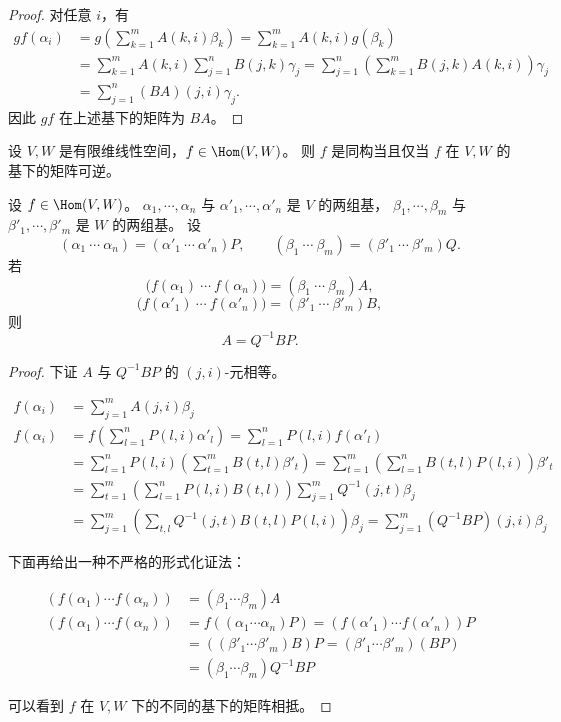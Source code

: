 \begin{proof}
	对任意 $i$，有
	\[
	\begin{aligned}
		gf(\alpha_i)
		&=g\left(\sum_{k=1}^{m}A(k,i)\beta_k\right)=\sum_{k=1}^{m}A(k,i)g(\beta_k)\\
		&=\sum_{k=1}^{m}A(k,i)\sum_{j=1}^{n}B(j,k)\gamma_j=\sum_{j=1}^{n}\left(\sum_{k=1}^{m}B(j,k)A(k,i)\right)\gamma_j\\
		&=\sum_{j=1}^{n}(BA)(j,i)\gamma_j.
	\end{aligned}
	\]
	因此 $gf$ 在上述基下的矩阵为 $BA$。
\end{proof}

\begin{corollary}
	设 $V,W$ 是有限维线性空间，$f\in\Hom(V,W)$。
	则 $f$ 是同构当且仅当 $f$ 在 $V,W$ 的基下的矩阵可逆。
\end{corollary}

\begin{proposition}
	设 $f\in\Hom(V,W)$。
	$\alpha_1,\cdots,\alpha_n$ 与 $\alpha'_1,\cdots,\alpha'_n$ 是 $V$ 的两组基，
	$\beta_1,\cdots,\beta_m$ 与 $\beta'_1,\cdots,\beta'_m$ 是 $W$ 的两组基。
	设
	\[
	(\alpha_1\ \cdots\ \alpha_n)
	=(\alpha'_1\ \cdots\ \alpha'_n)P,
	\qquad
	(\beta_1\ \cdots\ \beta_m)
	=(\beta'_1\ \cdots\ \beta'_m)Q.
	\]
	若
	\[
	\bigl(f(\alpha_1)\ \cdots\ f(\alpha_n)\bigr)
	=(\beta_1\ \cdots\ \beta_m)A,
	\]
	\[
	\bigl(f(\alpha'_1)\ \cdots\ f(\alpha'_n)\bigr)
	=(\beta'_1\ \cdots\ \beta'_m)B,
	\]
	则
	\[
	A=Q^{-1}BP.
	\]
\end{proposition}

\begin{proof}
	下证 $A$ 与 $Q^{-1}BP$ 的 $(j,i)$-元相等。
	
	\[
	\begin{aligned}
		f(\alpha_i) &= \sum_{j=1}^m A(j,i) \beta_j \\
		f(\alpha_i) &= f\left( \sum_{l=1}^n P(l,i) \alpha'_l \right) = \sum_{l=1}^n P(l,i) f(\alpha'_l)\\
			&= \sum_{l=1}^n P(l,i) \left( \sum_{t=1}^m B(t,l) \beta'_t \right) = \sum_{t=1}^m \left( \sum_{l=1}^n B(t,l) P(l,i) \right) \beta'_t \\
		&= \sum_{t=1}^m \left( \sum_{l=1}^n P(l,i) B(t,l) \right) \sum_{j=1}^m Q^{-1}(j,t) \beta_j \\
		&= \sum_{j=1}^m \left( \sum_{t,l} Q^{-1}(j,t) B(t,l) P(l,i) \right) \beta_j = \sum_{j=1}^m (Q^{-1}BP)(j,i) \beta_j
	\end{aligned}
	\]

	下面再给出一种不严格的形式化证法：
	
	\[
	\begin{aligned}
		(f(\alpha_1) \cdots f(\alpha_n)) &= (\beta_1 \cdots \beta_m) A \\
		(f(\alpha_1) \cdots f(\alpha_n)) &= f\left( (\alpha_1 \cdots \alpha_n) P \right) = (f(\alpha'_1) \cdots f(\alpha'_n)) P \\
		&= \left( (\beta'_1 \cdots \beta'_m) B \right) P = (\beta'_1 \cdots \beta'_m) (BP) \\
		&= (\beta_1 \cdots \beta_m) Q^{-1} BP
	\end{aligned}
	\]
	
	可以看到 $f$ 在 $V,W$ 下的不同的基下的矩阵相抵。
\end{proof}

